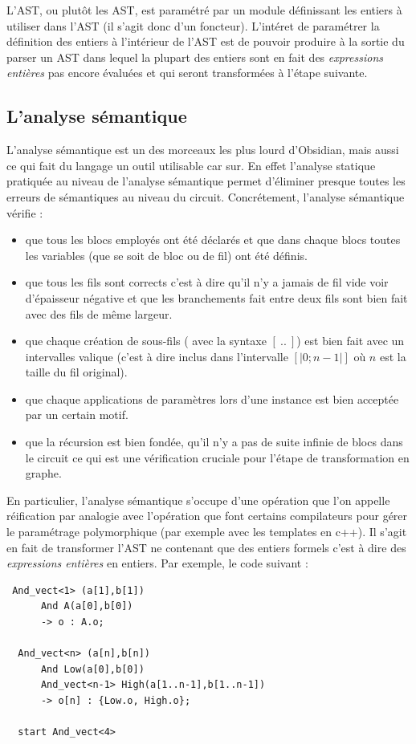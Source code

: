 \documentclass[13pt]{article}
\begin{document}
L'AST, ou plutôt les AST, est paramétré par un module définissant les entiers à
utiliser dans l'AST (il s'agit donc d'un foncteur). L'intéret de paramétrer la
définition des entiers à l'intérieur de l'AST est de pouvoir produire à la
sortie du parser un AST dans lequel la plupart des \og entiers\fg{} sont en fait
des \emph{expressions entières} pas encore évaluées et qui seront transformées à
l'étape suivante.

\subsection{L'analyse sémantique}

L'analyse sémantique est un des morceaux les plus lourd d'Obsidian, mais aussi
ce qui fait du langage un outil utilisable car sur. En effet l'analyse statique
pratiquée au niveau de l'analyse sémantique permet d'éliminer presque toutes les
erreurs de sémantiques au niveau du circuit. Concrétement, l'analyse sémantique
vérifie :
\begin{itemize}
\item que tous les blocs employés ont été déclarés et que dans chaque blocs
  toutes les variables (que se soit de bloc ou de fil) ont été définis.
\item que tous les fils sont corrects c'est à dire qu'il n'y a jamais de fil
  vide voir d'épaisseur négative et que les branchements fait entre deux fils
  sont bien fait avec des fils de même largeur.
\item que chaque création de sous-fils ( avec la syntaxe $[\ ..\ ]$) est bien
  fait avec un intervalles valique (c'est à dire inclus dans l'intervalle $[| 0
  ; n - 1|]$ où $n$ est la taille du fil original).
\item que chaque applications de paramètres lors d'une instance est bien
  acceptée par un certain motif.
\item que la récursion est bien fondée, qu'il n'y a pas de suite infinie de
  blocs dans le circuit ce qui est une vérification cruciale pour l'étape de
  transformation en graphe. 
\end{itemize}

En particulier, l'analyse sémantique s'occupe d'une opération que l'on appelle
réification par analogie avec l'opération que font certains compilateurs pour
gérer le paramétrage polymorphique (par exemple avec les templates en c++). Il
s'agit en fait de transformer l'AST ne contenant que des entiers \og
formels\fg{} c'est à dire des \emph{expressions entières} en entiers.
Par exemple, le code suivant :
\begin{verbatim}
 And_vect<1> (a[1],b[1]) 
      And A(a[0],b[0])
      -> o : A.o;

  And_vect<n> (a[n],b[n])
      And Low(a[0],b[0])
      And_vect<n-1> High(a[1..n-1],b[1..n-1])
      -> o[n] : {Low.o, High.o};

  start And_vect<4>
\end{verbatim}
\end{document}
